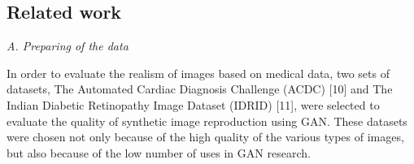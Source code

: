 \documentclass[10pt, a4paper]{article}
\begin{document}
\begin{multicols}{2}
\section{Related work}
\textit{A. Preparing of the data}
\vspace{0.2cm}
\par
In order to evaluate the realism of images based on medical data, two sets of datasets, The Automated Cardiac Diagnosis Challenge (ACDC) [10] and The Indian Diabetic Retinopathy Image Dataset (IDRID) [11], were selected to evaluate the quality of synthetic image reproduction using GAN. These datasets were chosen not only because of the high quality of the various types of images, but also because of the low number of uses in GAN research.
\end{multicols}

\newpage
\fontsize{10}{14}\selectfont
\end{document}
